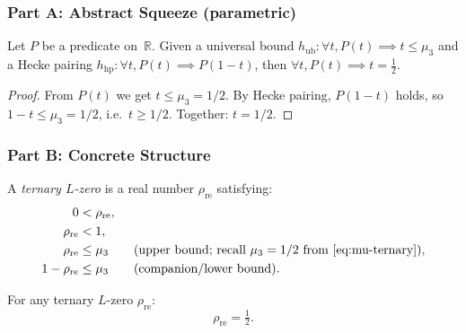 \subsubsection{Part A: Abstract Squeeze (parametric)}

\begin{theorem}\label{thm:abstract-squeeze}
Let $P$ be a predicate on~$\mathbb{R}$. Given a universal bound $h_{\mathrm{ub}}\colon \forall t, P(t)\implies t\le\mu_3$ and a Hecke pairing $h_{\mathrm{hp}}\colon \forall t, P(t)\implies P(1-t)$, then $\forall t, P(t)\implies t = \tfrac{1}{2}$.
\end{theorem}

\begin{proof}
From $P(t)$ we get $t\le\mu_3 = 1/2$.  By Hecke pairing, $P(1-t)$
holds, so $1-t\le\mu_3 = 1/2$, i.e.\ $t\ge 1/2$.  Together: $t=1/2$.
\end{proof}

\subsubsection{Part B: Concrete Structure}

\begin{definition}\label{def:TernaryLZero}
A \emph{ternary $L$-zero} is a real number $\rho_{\mathrm{re}}$
satisfying:
\begin{align}
  0 &< \rho_{\mathrm{re}},
    \label{eq:TLZ-pos}  \\
  \rho_{\mathrm{re}} &< 1,
    \label{eq:TLZ-strip}  \\
  \rho_{\mathrm{re}} &\le \mu_3
    \qquad\text{(upper bound; recall $\mu_3=1/2$ from~\cref{eq:mu-ternary})},
    \label{eq:TLZ-upper}  \\
  1 - \rho_{\mathrm{re}} &\le \mu_3
    \qquad\text{(companion/lower bound)}.
    \label{eq:TLZ-lower}
\end{align}
\end{definition}

\begin{theorem}[RH squeeze]\label{thm:rh-squeeze}
For any ternary $L$-zero $\rho_{\mathrm{re}}$:
\begin{equation}\label{eq:rh-squeeze}
  \rho_{\mathrm{re}} = \tfrac{1}{2}.
\end{equation}
\end{theorem}

